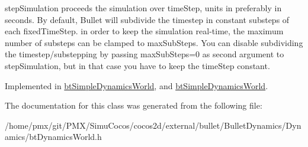step\+Simulation proceeds the simulation over \textquotesingle{}time\+Step\textquotesingle{}, units in preferably in seconds. By default, Bullet will subdivide the timestep in constant substeps of each \textquotesingle{}fixed\+Time\+Step\textquotesingle{}. in order to keep the simulation real-\/time, the maximum number of substeps can be clamped to \textquotesingle{}max\+Sub\+Steps\textquotesingle{}. You can disable subdividing the timestep/substepping by passing max\+Sub\+Steps=0 as second argument to step\+Simulation, but in that case you have to keep the time\+Step constant. 

Implemented in \hyperlink{classbtSimpleDynamicsWorld_af6b4810b5018cbaf09f82839111a243d}{bt\+Simple\+Dynamics\+World}, and \hyperlink{classbtSimpleDynamicsWorld_a43bce5ebc50b034e7c2860a01bba5872}{bt\+Simple\+Dynamics\+World}.



The documentation for this class was generated from the following file\+:\begin{DoxyCompactItemize}
\item 
/home/pmx/git/\+P\+M\+X/\+Simu\+Cocos/cocos2d/external/bullet/\+Bullet\+Dynamics/\+Dynamics/bt\+Dynamics\+World.\+h\end{DoxyCompactItemize}
